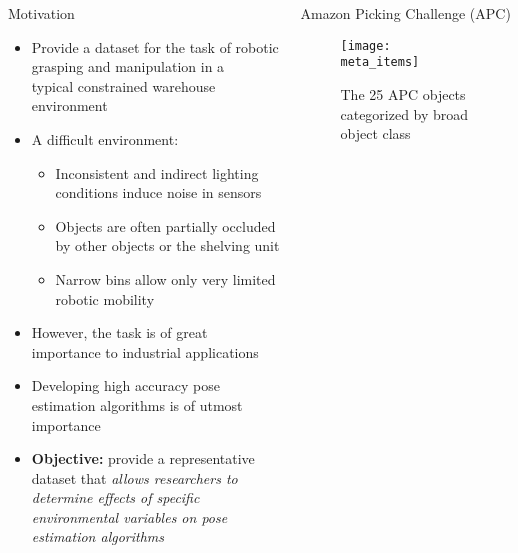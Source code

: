 \begin{columns}[t]
	\begin{column}{0.50\textwidth}
		\begin{block}{\large Motivation}
		    \centering
				    \vspace{-0.1in}
				    \begin{itemize}
					    \item Provide a dataset for the task of robotic grasping and manipulation in a \\typical constrained warehouse environment
					    \item A difficult environment:
					   	\begin{itemize}
					   		\item Inconsistent and indirect lighting conditions induce noise in sensors 
					   		\item Objects are often partially occluded by other objects or the shelving unit
					   		\item Narrow bins allow only very limited robotic mobility 
					   	\end{itemize}
					   	\item However, the task is of great importance to industrial applications 
					   	\item Developing high accuracy pose estimation algorithms is of utmost importance
					   	\item \textbf{Objective:} provide a representative dataset that \emph{allows researchers to \\determine effects of specific environmental variables on pose estimation algorithms} 
				    \end{itemize}
		\end{block}
	\end{column}
	\begin{column}{0.50\textwidth}
		\begin{block}{\large Amazon Picking Challenge (APC)}
		    \centering
		    	\begin{figure}[h]
		    		\texttt{[image: meta\_items]}	\hspace{0.1in}
		    		\caption{The 25 APC objects categorized by broad object class}
	    		\end{figure}

\end{block}
\end{column}
\end{columns}

